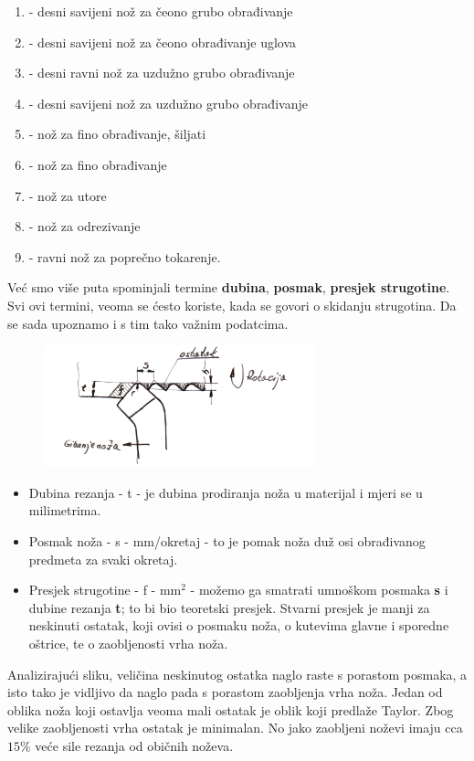 \documentclass[a4paper,12pt]{article}
\numberwithin{figure}{section}
\begin{document}
\begin{enumerate}
\item - desni savijeni nož za čeono grubo obrađivanje
\item - desni savijeni nož za čeono obrađivanje uglova
\item - desni ravni nož za uzdužno grubo obrađivanje
\item - desni savijeni nož za uzdužno grubo obrađivanje
\item - nož za fino obrađivanje, šiljati
\item - nož za fino obrađivanje
\item - nož za utore
\item - nož za odrezivanje
\item - ravni nož za poprečno tokarenje.
\end{enumerate}
Već smo više puta spominjali termine \textbf{dubina}, \textbf{posmak}, \textbf{presjek strugotine}. Svi ovi termini, veoma se ćesto koriste, kada se govori o skidanju strugotina. Da se sada upoznamo i s tim tako važnim podatcima.
\begin{figure}[!h]
\includegraphics[width=0.7\textwidth]{image_08-1.png}
\end{figure}
\FloatBarrier
\begin{itemize}
\item Dubina rezanja - t - je dubina prodiranja noža u materijal i mjeri se u milimetrima.
\item Posmak noža - s - mm/okretaj - to je pomak noža duž osi obrađivanog predmeta za svaki okretaj.
\item Presjek strugotine - f - mm$^2$ - možemo ga smatrati umnoškom posmaka \textbf{s} i dubine rezanja \textbf{t}; to bi bio teoretski presjek. Stvarni presjek je manji za neskinuti ostatak, koji ovisi o posmaku noža, o kutevima glavne i sporedne oštrice, te o zaobljenosti vrha noža.
\end{itemize}
Analizirajući sliku, veličina neskinutog ostatka naglo raste s porastom posmaka, a isto tako je vidljivo da naglo pada s porastom zaobljenja vrha noža. Jedan od oblika noža koji ostavlja veoma mali ostatak je oblik koji predlaže Taylor. Zbog velike zaobljenosti vrha ostatak je minimalan. No jako zaobljeni noževi imaju cca $15\%$ veće sile rezanja od običnih noževa.
\end{document}
